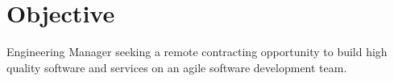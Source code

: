 \section{Objective}
  Engineering Manager seeking a remote contracting opportunity to build high quality software and services on an agile software development team.
